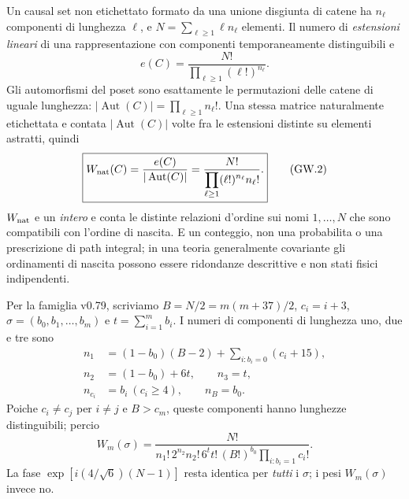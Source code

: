 \documentclass[11pt,a4paper]{article}
\begin{document}
Un causal set non etichettato formato da una unione disgiunta di catene ha $n_\ell$ componenti di lunghezza $\ell$, e $N=\sum_{\ell\ge1}\ell n_\ell$ elementi. Il numero di \emph{estensioni lineari} di una rappresentazione con componenti temporaneamente distinguibili e
\begin{equation}
 e(C)=\frac{N!}{\prod_{\ell\ge1}(\ell!)^{n_\ell}}.
 \tag{GW.1}
\end{equation}
Gli automorfismi del poset sono esattamente le permutazioni delle catene di uguale lunghezza: $|\operatorname{Aut}(C)|=\prod_{\ell\ge1}n_\ell!$. Una stessa matrice naturalmente etichettata e contata $|\operatorname{Aut}(C)|$ volte fra le estensioni distinte su elementi astratti, quindi
\begin{equation}
 \boxed{W_{\rm nat}(C)=\frac{e(C)}{|\operatorname{Aut}(C)|}
 =\frac{N!}{\displaystyle\prod_{\ell\ge1}(\ell!)^{n_\ell}n_\ell!}.}
 \tag{GW.2}
\end{equation}
$W_{\rm nat}$ e un \emph{intero} e conta le distinte relazioni d'ordine sui nomi $1,\ldots,N$ che sono compatibili con l'ordine di nascita. E un conteggio, non una probabilita o una prescrizione di path integral; in una teoria generalmente covariante gli ordinamenti di nascita possono essere ridondanze descrittive e non stati fisici indipendenti.

Per la famiglia v0.79, scriviamo $B=N/2=m(m+37)/2$, $c_i=i+3$, $\sigma=(b_0,b_1,\ldots,b_m)$ e $t=\sum_{i=1}^m b_i$. I numeri di componenti di lunghezza uno, due e tre sono
\begin{equation}
 \begin{aligned}
 n_1&=(1-b_0)(B-2)+\sum_{i:b_i=0}(c_i+15),\\
 n_2&=(1-b_0)+6t,\qquad n_3=t,\\
 n_{c_i}&=b_i\ (c_i\ge4),\qquad n_B=b_0.
 \end{aligned}\tag{GW.3}
\end{equation}
Poiche $c_i\neq c_j$ per $i\neq j$ e $B>c_m$, queste componenti hanno lunghezze distinguibili; percio
\begin{equation}
 \boxed{W_m(\sigma)=\frac{N!}{n_1!\,2^{n_2}n_2!\,6^t t!\,
 (B!)^{b_0}\prod_{i:b_i=1}c_i!}.}
 \tag{GW.4}
\end{equation}
La fase $\exp[i(4/\sqrt6)(N-1)]$ resta identica per \emph{tutti} i $\sigma$; i pesi $W_m(\sigma)$ invece no.

\clearpage
\end{document}
